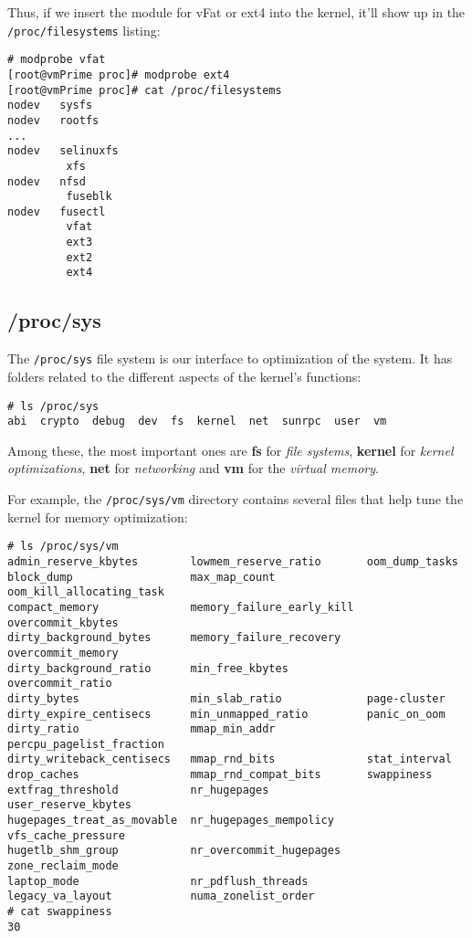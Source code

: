 \noindent
Thus, if we insert the module for vFat or ext4 into the kernel, it'll show up in the \verb|/proc/filesystems| listing:

\vspace{-15pt}
\begin{verbatim}
# modprobe vfat
[root@vmPrime proc]# modprobe ext4
[root@vmPrime proc]# cat /proc/filesystems 
nodev	sysfs
nodev	rootfs
...
nodev	selinuxfs
	     xfs
nodev	nfsd
	     fuseblk
nodev	fusectl
	     vfat
	     ext3
	     ext2
	     ext4
\end{verbatim}
\vspace{-10pt}	

\subsection{/proc/sys}
The \verb|/proc/sys| file system is our interface to optimization of the system. It has folders related to the different aspects of the kernel's functions:

\vspace{-15pt}
\begin{verbatim}
# ls /proc/sys
abi  crypto  debug  dev  fs  kernel  net  sunrpc  user  vm
\end{verbatim}
\vspace{-10pt}	

\noindent
Among these, the most important ones are \textbf{fs} for \textit{file systems}, \textbf{kernel} for \textit{kernel optimizations}, \textbf{net} for \textit{networking} and \textbf{vm} for the \textit{virtual memory}. 

For example, the \verb|/proc/sys/vm| directory contains several files that help tune the kernel for memory optimization:

\vspace{-15pt}
\begin{verbatim}
# ls /proc/sys/vm
admin_reserve_kbytes        lowmem_reserve_ratio       oom_dump_tasks
block_dump                  max_map_count              oom_kill_allocating_task
compact_memory              memory_failure_early_kill  overcommit_kbytes
dirty_background_bytes      memory_failure_recovery    overcommit_memory
dirty_background_ratio      min_free_kbytes            overcommit_ratio
dirty_bytes                 min_slab_ratio             page-cluster
dirty_expire_centisecs      min_unmapped_ratio         panic_on_oom
dirty_ratio                 mmap_min_addr              percpu_pagelist_fraction
dirty_writeback_centisecs   mmap_rnd_bits              stat_interval
drop_caches                 mmap_rnd_compat_bits       swappiness
extfrag_threshold           nr_hugepages               user_reserve_kbytes
hugepages_treat_as_movable  nr_hugepages_mempolicy     vfs_cache_pressure
hugetlb_shm_group           nr_overcommit_hugepages    zone_reclaim_mode
laptop_mode                 nr_pdflush_threads
legacy_va_layout            numa_zonelist_order
# cat swappiness 
30
\end{verbatim}
\vspace{-10pt}	

